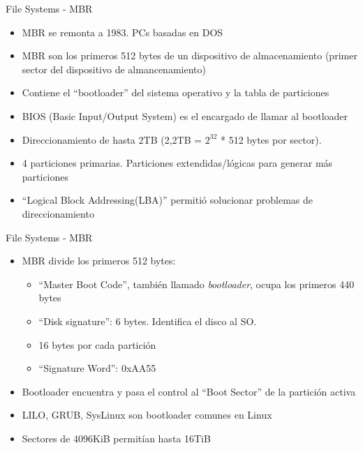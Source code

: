 \begin{frame}{File Systems - MBR}
 \begin{itemize}
  \item MBR se remonta a 1983. PCs basadas en DOS
  \item MBR son los primeros 512 bytes de un dispositivo de almacenamiento (primer sector del
    dispositivo de almancenamiento)
  \item Contiene el ``bootloader'' del sistema operativo y la tabla de particiones
  \item BIOS (Basic Input/Output System) es el encargado de llamar al bootloader
  \item Direccionamiento de hasta 2TB (2,2TB = $2^{32}$ * 512 bytes por sector). 
  \item 4 particiones primarias. Particiones extendidas/lógicas para generar más particiones 
  \item ``Logical Block Addressing(LBA)'' permitió solucionar problemas de direccionamiento 
 \end{itemize}
\end{frame}

\begin{frame}{File Systems - MBR}
 \begin{itemize}
  \item MBR divide los primeros 512 bytes:
  \begin{itemize}
   \item ``Master Boot Code'', también llamado {\it bootloader}, ocupa los primeros 440 bytes
   \item ``Disk signature'': 6 bytes. Identifica el disco al SO.
   \item 16 bytes por cada partición 
   \item ``Signature Word'': 0xAA55
  \end{itemize}
  \item Bootloader encuentra y pasa el control al ``Boot Sector'' de la partición activa
  \item LILO, GRUB, SysLinux son bootloader comunes en Linux
  \item Sectores de 4096KiB permitían hasta 16TiB 
 \end{itemize}
\end{frame}


